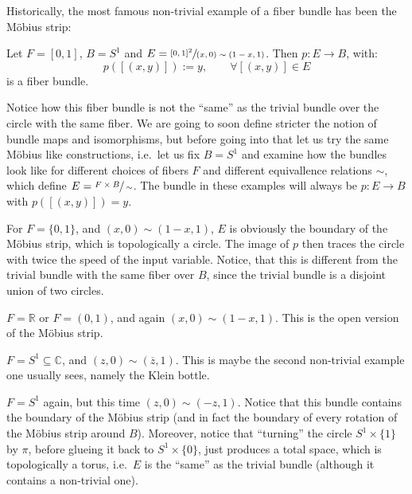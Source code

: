 Historically, the most famous non-trivial example of a fiber bundle has been the M\"obius strip:
\begin{example} Let $F=[0,1]$, $B=S^1$ and $E=\sfrac{{[0,1]}^2}{(x,0)\sim(1-x,1)}$. Then $p:E\to B$, with:
\[p([(x,y)]):= y,\qquad\forall [(x,y)]\in E\]
is a fiber bundle.
\end{example}
Notice how this fiber bundle is not the ``same'' as the trivial bundle over the circle with the same fiber. We are going to soon define stricter the notion of bundle maps and isomorphisms, but before going into that let us try the same M\"obius like constructions, i.e.\ let us fix $B=S^1$ and examine how the bundles look like for different choices of fibers $F$ and different equivallence relations $\sim$, which define $E=\sfrac{F\times B}{\sim}$. The bundle in these examples will always be $p:E\to B$ with $p([(x,y)])=y$.

\begin{examples}
\begin{i_enum}
\item For $F=\{0,1\}$, and $(x,0)\sim(1-x,1)$, $E$ is obviously the boundary of the M\"obius strip, which is topologically a circle. The image of $p$ then traces the circle with twice the speed of the input variable. Notice, that this is different from the trivial bundle with the same fiber over $B$, since the trivial bundle is a disjoint union of two circles.
\item $F=\mathbb{R}$ or $F=(0,1)$, and again $(x,0)\sim(1-x,1)$. This is the open version of the M\"obius strip.
\item $F=S^1\subseteq\mathbb{C}$, and $(z,0)\sim(\overline{z},1)$. This is maybe the second non-trivial example one usually sees, namely the Klein bottle.
\item $F=S^1$ again, but this time $(z,0)\sim(-z,1)$. Notice that this bundle contains the boundary of the M\"obius strip (and in fact the boundary of every rotation of the M\"obius strip around $B$). Moreover, notice that ``turning'' the circle $S^1\times\{1\}$ by $\pi$, before glueing it back to $S^1\times\{0\}$, just produces a total space, which is topologically a torus, i.e.\ $E$ is the ``same'' as the trivial bundle (although it contains a non-trivial one).
\end{i_enum}
\end{examples}

